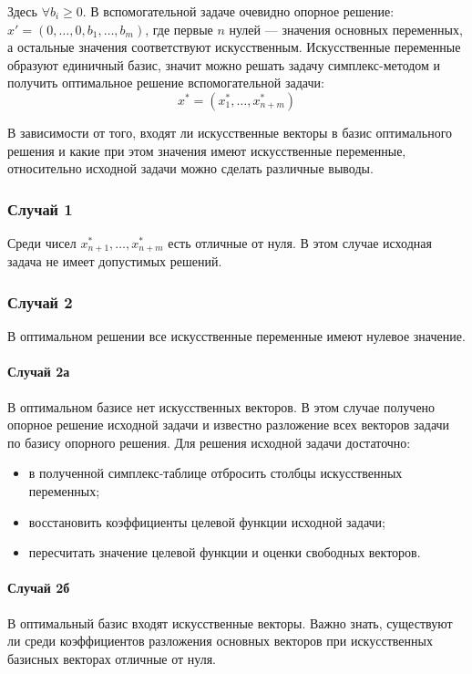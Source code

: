 \documentclass[17pt]{extarticle}
\begin{document}
Здесь \( \forall b_i \ge 0 \). В вспомогательной задаче очевидно опорное решение: \( x' = (0, \dots, 0, b_1, \dots, b_m) \), где первые \( n \) нулей — значения основных переменных, а остальные значения соответствуют искусственным. Искусственные переменные образуют единичный базис, значит можно решать задачу симплекс-методом и получить оптимальное решение вспомогательной задачи:
\[
    x^* = (x_1^*, \dots, x_{n+m}^*)
\]

В зависимости от того, входят ли искусственные векторы в базис оптимального решения и какие при этом значения имеют искусственные переменные, относительно исходной задачи можно сделать различные выводы.

\subsubsection{Случай 1}
Среди чисел \( x_{n+1}^*, \dots, x_{n+m}^* \) есть отличные от нуля. В этом случае исходная задача не имеет допустимых решений.

\subsubsection{Случай 2}
В оптимальном решении все искусственные переменные имеют нулевое значение.

\paragraph{Случай 2а}
В оптимальном базисе нет искусственных векторов. В этом случае получено опорное решение исходной задачи и известно разложение всех векторов задачи по базису опорного решения. Для решения исходной задачи достаточно:
\begin{itemize}
    \item в полученной симплекс-таблице отбросить столбцы искусственных переменных;
    \item восстановить коэффициенты целевой функции исходной задачи;
    \item пересчитать значение целевой функции и оценки свободных векторов.
\end{itemize}

\paragraph{Случай 2б}
В оптимальный базис входят искусственные векторы. Важно знать, существуют ли среди коэффициентов разложения основных векторов при искусственных базисных векторах отличные от нуля.
\end{document}
